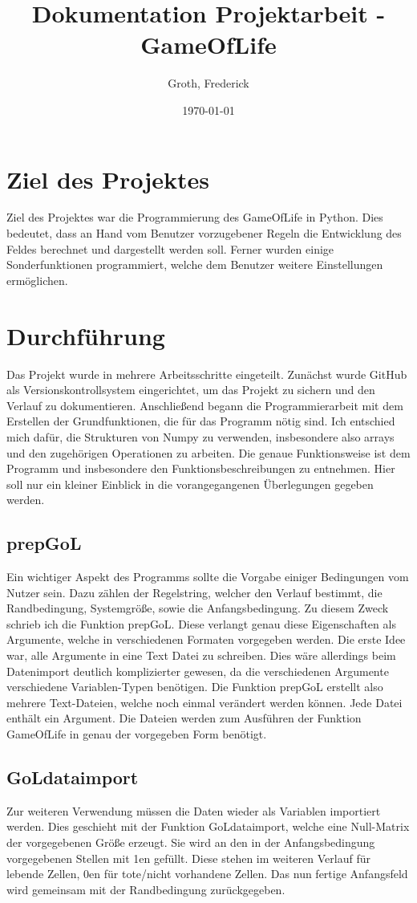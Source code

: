 \documentclass{scrartcl}
\begin{document}
\title{Dokumentation Projektarbeit - GameOfLife}
\author{Groth, Frederick}
\date{\today}
\maketitle
\newpage
\tableofcontents
\newpage
\section{Ziel des Projektes}
Ziel des Projektes war die Programmierung des GameOfLife in Python.
Dies bedeutet, dass an Hand vom Benutzer vorzugebener Regeln die Entwicklung des Feldes berechnet und dargestellt werden soll. Ferner wurden einige Sonderfunktionen programmiert, welche dem Benutzer weitere Einstellungen ermöglichen.
\section{Durchführung}
Das Projekt wurde in mehrere Arbeitsschritte eingeteilt. Zunächst wurde GitHub als Versionskontrollsystem eingerichtet, um das Projekt zu sichern und den Verlauf zu dokumentieren. Anschließend begann die Programmierarbeit mit dem Erstellen der Grundfunktionen, die für das Programm nötig sind. Ich entschied mich dafür, die Strukturen von Numpy zu verwenden, insbesondere also arrays und den zugehörigen Operationen zu arbeiten. Die genaue Funktionsweise ist dem Programm und insbesondere den Funktionsbeschreibungen zu entnehmen. Hier soll nur ein kleiner Einblick in die vorangegangenen Überlegungen gegeben werden.
\subsection{prepGoL}
Ein wichtiger Aspekt des Programms sollte die Vorgabe einiger Bedingungen vom Nutzer sein. Dazu zählen der Regelstring, welcher den Verlauf bestimmt, die Randbedingung, Systemgröße, sowie die Anfangsbedingung. Zu diesem Zweck schrieb ich die Funktion prepGoL. Diese verlangt genau diese Eigenschaften als Argumente, welche in verschiedenen Formaten vorgegeben werden. Die erste Idee war, alle Argumente in eine Text Datei zu schreiben. Dies wäre allerdings beim Datenimport deutlich komplizierter gewesen, da die verschiedenen Argumente verschiedene Variablen-Typen benötigen. Die Funktion prepGoL erstellt also mehrere Text-Dateien, welche noch einmal verändert werden können. Jede Datei enthält ein Argument. Die Dateien werden zum Ausführen der Funktion GameOfLife in genau der vorgegeben Form benötigt.
\subsection{GoLdataimport}
Zur weiteren Verwendung müssen die Daten wieder als Variablen importiert werden. Dies geschieht mit der Funktion GoLdataimport, welche eine Null-Matrix der vorgegebenen Größe erzeugt. Sie wird an den in der Anfangsbedingung vorgegebenen Stellen mit 1en gefüllt. Diese stehen im weiteren Verlauf für lebende Zellen, 0en für tote/nicht vorhandene Zellen. Das nun fertige Anfangsfeld wird gemeinsam mit der Randbedingung zurückgegeben.
\end{document}
